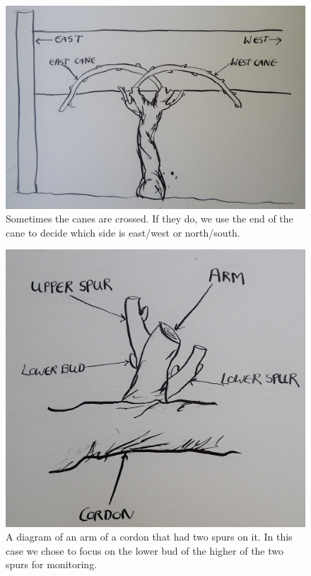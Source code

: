 \documentclass[11pt,letter]{article}
\begin{document}
\begin{figure}
  \includegraphics[width=\linewidth]{CaneCrossing.jpg}
  \caption{Sometimes the canes are crossed. If they do, we use the end of the cane to decide which side is east/west or north/south.}
  \label{fig:CaneCrossing}
\end{figure}

\begin{figure}
  \includegraphics[width=\linewidth]{TwoSpurs.jpg}
  \caption{A diagram of an arm of a cordon that had two spurs on it. In this case we chose to focus on the lower bud of the higher of the two spurs for monitoring.}
  \label{fig:TwoSpurs}
\end{figure}
\end{document}

